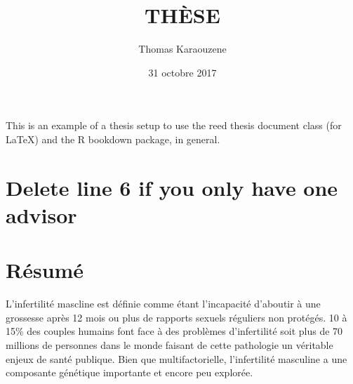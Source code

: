 \documentclass[12pt,twoside]{reedthesis}
\title{THÈSE}
\author{Thomas Karaouzene}
\date{31 octobre 2017}
\theoremstyle{definition}
\theoremstyle{definition}
\theoremstyle{remark}
\begin{document}
      \maketitle
  
  \frontmatter %
  \pagestyle{empty} %

  
      \begin{preface}
      This is an example of a thesis setup to use the reed thesis document
      class (for LaTeX) and the R bookdown package, in general.
    \end{preface}
  
      \hypersetup{linkcolor=black}
    \setcounter{tocdepth}{3}
    \tableofcontents
  
      \listoftables
  
      \listoffigures
  
  
  
  \mainmatter %
  \pagestyle{fancyplain} %

  \chapter{Delete line 6 if you only have one
  advisor}\label{delete-line-6-if-you-only-have-one-advisor}
  
  \chapter*{Résumé}\label{resume}
  
  \newpage
  
  L'infertilité mascline est définie comme étant l'incapacité d'aboutir à
  une grossesse après 12 mois ou plus de rapports sexuels réguliers non
  protégés. 10 à 15\% des couples humains font face à des problèmes
  d'infertilité soit plus de 70 millions de personnes dans le monde
  faisant de cette pathologie un véritable enjeux de santé publique. Bien
  que multifactorielle, l'infertilité masculine a une composante génétique
  importante et encore peu explorée.
  
\end{document}
